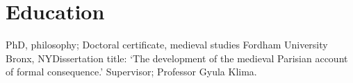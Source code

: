 \section{Education}
{PhD, philosophy; Doctoral certificate, medieval studies}
{Fordham University}
{Bronx, NY}{}{Dissertation title: `The development of the medieval Parisian account of formal consequence.' Supervisor; Professor Gyula Klima.}  %
